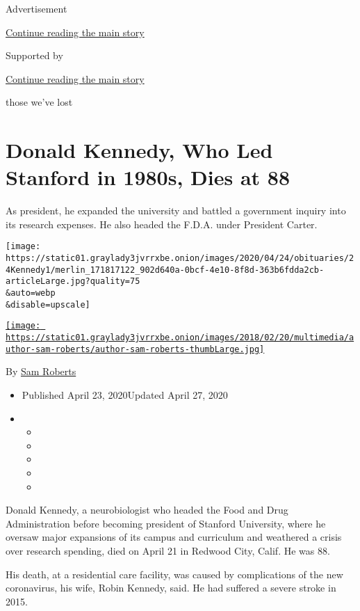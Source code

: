Advertisement

\protect\hyperlink{after-top}{Continue reading the main story}

Supported by

\protect\hyperlink{after-sponsor}{Continue reading the main story}

those we've lost

\hypertarget{donald-kennedy-who-led-stanford-in-1980s-dies-at-88}{%
\section{Donald Kennedy, Who Led Stanford in 1980s, Dies at
88}\label{donald-kennedy-who-led-stanford-in-1980s-dies-at-88}}

As president, he expanded the university and battled a government
inquiry into its research expenses. He also headed the F.D.A. under
President Carter.

\texttt{[image: https://static01.graylady3jvrrxbe.onion/images/2020/04/24/obituaries/24Kennedy1/merlin\_171817122\_902d640a-0bcf-4e10-8f8d-363b6fdda2cb-articleLarge.jpg?quality=75\\\&auto=webp\\\&disable=upscale]}

\href{https://www.nytimes3xbfgragh.onion/by/sam-roberts}{\texttt{[image: https://static01.graylady3jvrrxbe.onion/images/2018/02/20/multimedia/author-sam-roberts/author-sam-roberts-thumbLarge.jpg]}}

By \href{https://www.nytimes3xbfgragh.onion/by/sam-roberts}{Sam Roberts}

\begin{itemize}
\item
  Published April 23, 2020Updated April 27, 2020
\item
  \begin{itemize}
  \item
  \item
  \item
  \item
  \item
  \end{itemize}
\end{itemize}

Donald Kennedy, a neurobiologist who headed the Food and Drug
Administration before becoming president of Stanford University, where
he oversaw major expansions of its campus and curriculum and weathered a
crisis over research spending, died on April 21 in Redwood City, Calif.
He was 88.

His death, at a residential care facility, was caused by complications
of the new coronavirus, his wife, Robin Kennedy, said. He had suffered a
severe stroke in 2015.

